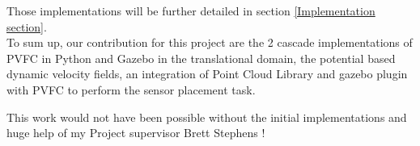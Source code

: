 Those implementations will be further detailed in section \ref{Implementation section}.\\
To sum up, our contribution for this project are the 2 cascade implementations of PVFC in Python and Gazebo in the translational domain, the potential based dynamic velocity fields, an integration of Point Cloud Library and gazebo plugin with PVFC to perform the sensor placement task.

This work would not have been possible without the initial implementations and huge help of my Project supervisor Brett Stephens ! 

